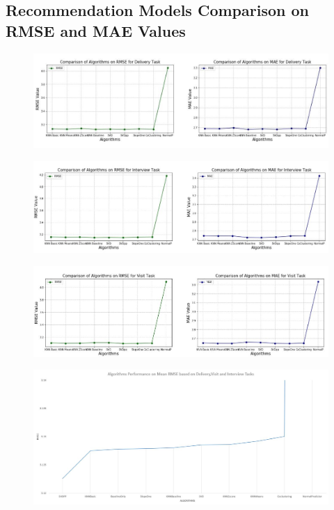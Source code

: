 \documentclass{aifyp}
\begin{document}
\begin{appendices}
\section{Recommendation Models Comparison on RMSE and MAE Values}
\begin{figure}[H]
    \centering
    \includegraphics[scale=0.7]{Images/Chapter6/Plot9Delivery.JPG}
    \label{fig:Plot9Delivery}
\end{figure}
\begin{figure}[H]
    \centering
    \includegraphics[scale=0.7]{Images/Chapter6/Plot9Interview.JPG}
    \label{fig:Plot9Interview}
\end{figure}
\begin{figure}[H]
    \centering
    \includegraphics[scale=0.7]{Images/Chapter6/PlotVisit.JPG}
    \label{fig:Plot9Visit}
\end{figure}
\begin{figure}[H]
    \centering
    \includegraphics[scale=0.4]{Images/Chapter6/MeanRMSE.JPG}

\end{figure}
\end{appendices}
\end{document}
